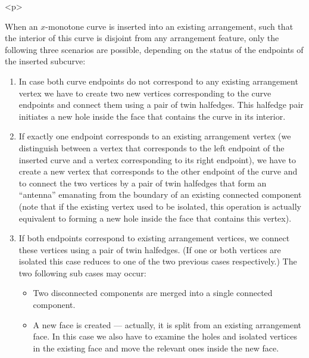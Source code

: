 \begin{ccHtmlOnly}<p>\end{ccHtmlOnly}
When an $x$-monotone curve is inserted into an existing arrangement, such
that the interior of this curve is disjoint from any arrangement feature,
only the following three scenarios are possible, depending on the status
of the endpoints of the inserted subcurve:
\begin{enumerate}
%
\item In case both curve endpoints do not correspond to any existing
arrangement vertex we have to create two new vertices
corresponding to the curve endpoints and connect them using a pair
of twin halfedges. This halfedge pair initiates a new hole inside
the face that contains the curve in its interior.
%
\item If exactly one endpoint corresponds to an existing arrangement
vertex (we distinguish between a vertex that corresponds to the left
endpoint of the inserted curve and a vertex corresponding to its right
endpoint), we have to create a new vertex that corresponds to the other
endpoint of the curve and to connect the two vertices by a pair of
twin halfedges that form an ``antenna'' emanating from the boundary
of an existing connected component (note that if the existing vertex
used to be isolated, this operation is actually equivalent to forming
a new hole inside the face that contains this vertex).
%
\item If both endpoints correspond to existing arrangement
vertices, we connect these vertices using a pair of twin halfedges.
(If one or both vertices are isolated this case reduces to one of
the two previous cases respectively.) The two following sub cases may
occur:
\begin{itemize}
\item Two disconnected components are merged into a single connected
component.
%
\item A new face is created --- actually, it is split from an existing
arrangement face. In this case we also have to examine the holes and
isolated vertices in the existing face and move the relevant ones
inside the new face.
\end{itemize}
\end{enumerate}

